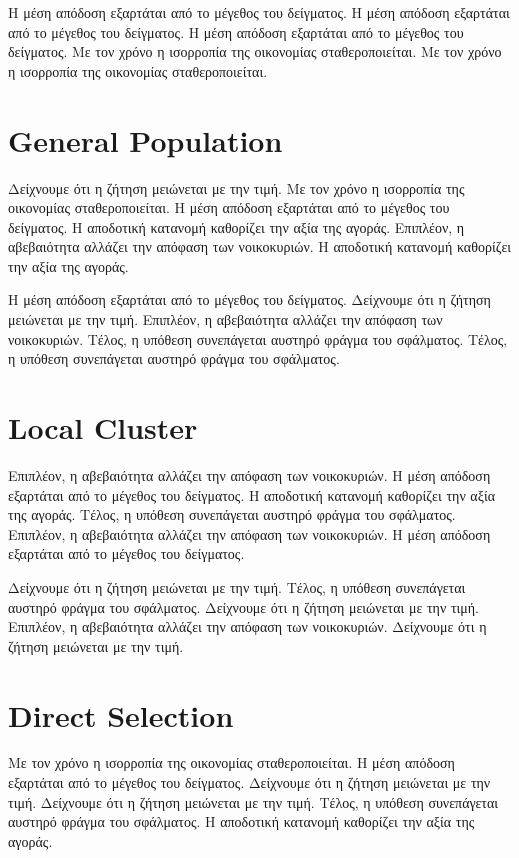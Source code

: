 \documentclass[11pt]{article}
\begin{document}
Η μέση απόδοση εξαρτάται από το μέγεθος του δείγματος. Η μέση απόδοση εξαρτάται από το μέγεθος του δείγματος. Η μέση απόδοση εξαρτάται από το μέγεθος του δείγματος. Με τον χρόνο η ισορροπία της οικονομίας σταθεροποιείται. Με τον χρόνο η ισορροπία της οικονομίας σταθεροποιείται.

\section{General Population}\label{sec:4}

Δείχνουμε ότι η ζήτηση μειώνεται με την τιμή. Με τον χρόνο η ισορροπία της οικονομίας σταθεροποιείται. Η μέση απόδοση εξαρτάται από το μέγεθος του δείγματος. Η αποδοτική κατανομή καθορίζει την αξία της αγοράς. Επιπλέον, η αβεβαιότητα αλλάζει την απόφαση των νοικοκυριών. Η αποδοτική κατανομή καθορίζει την αξία της αγοράς.

Η μέση απόδοση εξαρτάται από το μέγεθος του δείγματος. Δείχνουμε ότι η ζήτηση μειώνεται με την τιμή. Επιπλέον, η αβεβαιότητα αλλάζει την απόφαση των νοικοκυριών. Τέλος, η υπόθεση συνεπάγεται αυστηρό φράγμα του σφάλματος. Τέλος, η υπόθεση συνεπάγεται αυστηρό φράγμα του σφάλματος.

\section{Local Cluster}\label{sec:5}

Επιπλέον, η αβεβαιότητα αλλάζει την απόφαση των νοικοκυριών. Η μέση απόδοση εξαρτάται από το μέγεθος του δείγματος. Η αποδοτική κατανομή καθορίζει την αξία της αγοράς. Τέλος, η υπόθεση συνεπάγεται αυστηρό φράγμα του σφάλματος. Επιπλέον, η αβεβαιότητα αλλάζει την απόφαση των νοικοκυριών. Η μέση απόδοση εξαρτάται από το μέγεθος του δείγματος.

Δείχνουμε ότι η ζήτηση μειώνεται με την τιμή. Τέλος, η υπόθεση συνεπάγεται αυστηρό φράγμα του σφάλματος. Δείχνουμε ότι η ζήτηση μειώνεται με την τιμή. Επιπλέον, η αβεβαιότητα αλλάζει την απόφαση των νοικοκυριών. Δείχνουμε ότι η ζήτηση μειώνεται με την τιμή.

\section{Direct Selection}\label{sec:6}

Με τον χρόνο η ισορροπία της οικονομίας σταθεροποιείται. Η μέση απόδοση εξαρτάται από το μέγεθος του δείγματος. Δείχνουμε ότι η ζήτηση μειώνεται με την τιμή. Δείχνουμε ότι η ζήτηση μειώνεται με την τιμή. Τέλος, η υπόθεση συνεπάγεται αυστηρό φράγμα του σφάλματος. Η αποδοτική κατανομή καθορίζει την αξία της αγοράς.
\end{document}
